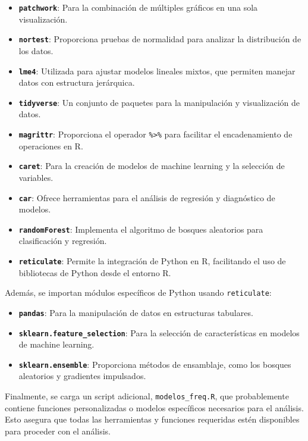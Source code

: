 \documentclass[
  12pt,
]{book}
\providecommand{\tightlist}{%
  \setlength{\itemsep}{0pt}\setlength{\parskip}{0pt}}
\begin{document}
\begin{itemize}
\tightlist
\item
  \textbf{\texttt{patchwork}}: Para la combinación de múltiples gráficos en una sola visualización.
\item
  \textbf{\texttt{nortest}}: Proporciona pruebas de normalidad para analizar la distribución de los datos.
\item
  \textbf{\texttt{lme4}}: Utilizada para ajustar modelos lineales mixtos, que permiten manejar datos con estructura jerárquica.
\item
  \textbf{\texttt{tidyverse}}: Un conjunto de paquetes para la manipulación y visualización de datos.
\item
  \textbf{\texttt{magrittr}}: Proporciona el operador \texttt{\%\textgreater{}\%} para facilitar el encadenamiento de operaciones en R.
\item
  \textbf{\texttt{caret}}: Para la creación de modelos de machine learning y la selección de variables.
\item
  \textbf{\texttt{car}}: Ofrece herramientas para el análisis de regresión y diagnóstico de modelos.
\item
  \textbf{\texttt{randomForest}}: Implementa el algoritmo de bosques aleatorios para clasificación y regresión.
\item
  \textbf{\texttt{reticulate}}: Permite la integración de Python en R, facilitando el uso de bibliotecas de Python desde el entorno R.
\end{itemize}

Además, se importan módulos específicos de Python usando \texttt{reticulate}:

\begin{itemize}
\tightlist
\item
  \textbf{\texttt{pandas}}: Para la manipulación de datos en estructuras tabulares.
\item
  \textbf{\texttt{sklearn.feature\_selection}}: Para la selección de características en modelos de machine learning.
\item
  \textbf{\texttt{sklearn.ensemble}}: Proporciona métodos de ensamblaje, como los bosques aleatorios y gradientes impulsados.
\end{itemize}

Finalmente, se carga un script adicional, \texttt{modelos\_freq.R}, que probablemente contiene funciones personalizadas o modelos específicos necesarios para el análisis. Esto asegura que todas las herramientas y funciones requeridas estén disponibles para proceder con el análisis.
\end{document}
